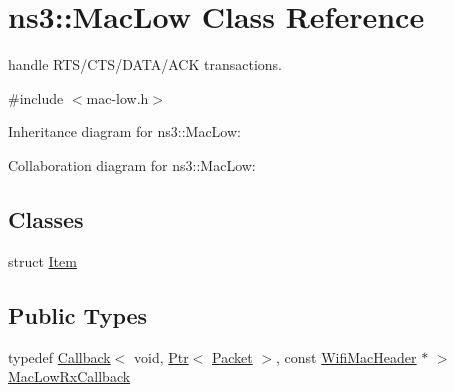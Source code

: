 \hypertarget{classns3_1_1MacLow}{}\section{ns3\+:\+:Mac\+Low Class Reference}
\label{classns3_1_1MacLow}


handle R\+T\+S/\+C\+T\+S/\+D\+A\+T\+A/\+A\+CK transactions.  




{\ttfamily \#include $<$mac-\/low.\+h$>$}



Inheritance diagram for ns3\+:\+:Mac\+Low\+:


Collaboration diagram for ns3\+:\+:Mac\+Low\+:
\subsection*{Classes}
\begin{DoxyCompactItemize}
\item 
struct \hyperlink{structns3_1_1MacLow_1_1Item}{Item}
\end{DoxyCompactItemize}
\subsection*{Public Types}
\begin{DoxyCompactItemize}
\item 
typedef \hyperlink{classns3_1_1Callback}{Callback}$<$ void, \hyperlink{classns3_1_1Ptr}{Ptr}$<$ \hyperlink{classns3_1_1Packet}{Packet} $>$, const \hyperlink{classns3_1_1WifiMacHeader}{Wifi\+Mac\+Header} $\ast$ $>$ \hyperlink{classns3_1_1MacLow_a1b2eb70255904d5aad88c6a6adbf6224}{Mac\+Low\+Rx\+Callback}
\end{DoxyCompactItemize}
